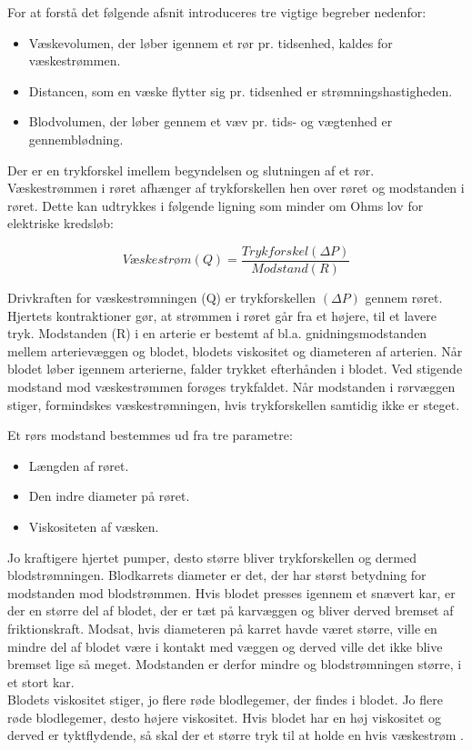 For at forstå det følgende afsnit introduceres tre vigtige begreber nedenfor: 
\begin{itemize}
\item Væskevolumen, der løber igennem et rør pr. tidsenhed, kaldes for væskestrømmen.
\item Distancen, som en væske flytter sig pr. tidsenhed er strømningshastigheden.
\item Blodvolumen, der løber gennem et væv pr. tids- og vægtenhed er gennemblødning.
\end{itemize}

Der er en trykforskel imellem begyndelsen og slutningen af et rør. Væskestrømmen i røret afhænger af trykforskellen hen over røret og modstanden i røret. Dette kan udtrykkes i følgende ligning som minder om Ohms lov for elektriske kredsløb:  

$$ Væskestrøm(Q)= \frac{Trykforskel(\Delta P)}{Modstand(R)}$$

Drivkraften for væskestrømningen (Q) er trykforskellen $(\Delta P)$ gennem røret. Hjertets kontraktioner gør, at strømmen i røret går fra et højere, til et lavere tryk. 
Modstanden (R) i en arterie er bestemt af bl.a. gnidningsmodstanden mellem arterievæggen og blodet, blodets viskositet og diameteren af arterien. Når blodet løber igennem arterierne, falder trykket efterhånden i blodet. Ved stigende modstand mod væskestrømmen forøges trykfaldet. 
Når modstanden i rørvæggen stiger, formindskes væskestrømningen, hvis trykforskellen samtidig ikke er steget.

Et rørs modstand bestemmes ud fra tre parametre: 

\begin{itemize}
\item Længden af røret.
\item Den indre diameter på røret. 
\item Viskositeten af væsken.
\end{itemize}

Jo kraftigere hjertet pumper, desto større bliver trykforskellen og dermed blodstrømningen. 
Blodkarrets diameter er det, der har størst betydning for modstanden mod blodstrømmen. Hvis blodet presses igennem et snævert kar, er der en større del af blodet, der er tæt på karvæggen og bliver derved bremset af friktionskraft. Modsat, hvis diameteren på karret havde været større, ville en mindre del af blodet være i kontakt med væggen og derved ville det ikke blive bremset lige så meget. Modstanden er derfor mindre og blodstrømningen større, i et stort kar. \\
Blodets viskositet stiger, jo flere røde blodlegemer, der findes i blodet. Jo flere røde blodlegemer, desto højere viskositet. Hvis blodet har en høj viskositet og derved er tyktflydende, så skal der et større tryk til at holde en hvis væskestrøm \citep{Blodtryk}. 
   
